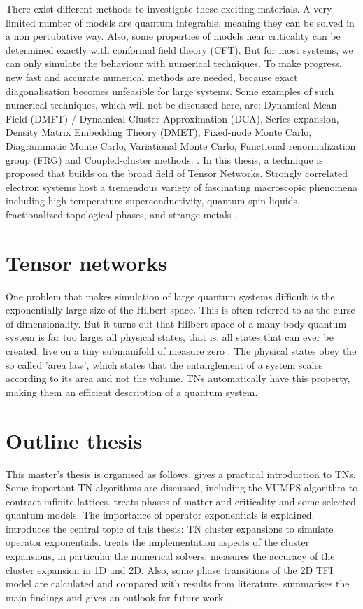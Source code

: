 There exist different methods to investigate these exciting materials. A very limited number of models are quantum integrable, meaning they can be solved in a non pertubative way. Also, some properties of models near criticality can be determined exactly with conformal field theory (CFT). But for most systems, we can only simulate the behaviour with numerical techniques. To make progress, new fast and accurate numerical methods are needed, because exact diagonalisation becomes unfeasible for large systems. Some examples of such numerical techniques, which will not be discussed here, are: Dynamical Mean Field (DMFT) / Dynamical Cluster Approximation  (DCA), Series expansion, Density Matrix Embedding Theory (DMET), Fixed-node Monte Carlo, Diagrammatic Monte Carlo, Variational Monte Carlo, Functional renormalization group (FRG) and Coupled-cluster methods. \cite{Corboz}. In this thesis, a technique is proposed that builds on the broad field of Tensor Networks.
Strongly correlated electron systems host a tremendous variety of fascinating macroscopic phenomena including high-temperature superconductivity, quantum spin-liquids, fractionalized topological phases, and strange metals \cite{Alexandradinata2020}.

\section{Tensor networks}

One problem that makes simulation of large quantum systems difficult is the exponentially large size of the Hilbert space.  This is often referred to as the curse of dimensionality. But it turns out that Hilbert space of a many-body quantum system is far too large: all physical states, that is, all states that can ever be created, live on a tiny submanifold of measure zero \cite{Cirac}. The physical states obey the so called 'area law', which states that the entanglement of a system scales according to its area and not the volume. \Glspl{TN} automatically have this property, making them an efficient description of a quantum system.


\section{Outline thesis}

This master's thesis is organised as follows.  gives a practical introduction to \Glspl{TN}. Some important \Gls{TN} algorithms are discussed, including the VUMPS algorithm to contract infinite lattices.  treats phases of matter and criticality and some selected quantum models. The importance of operator exponentials is explained.  introduces the central topic of this thesis: \Gls{TN} cluster expansions to simulate operator exponentials.  treats the implementation aspects of the cluster expansions, in particular the numerical solvers.  measures the accuracy of the cluster expansion in 1D and 2D. Also, some phase transitions of the 2D \Gls{TFI} model are calculated and compared with results from literature.  summarises the main findings and gives an outlook for future work.